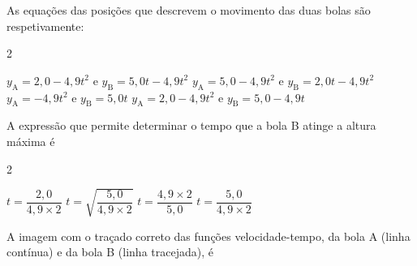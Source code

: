 \documentclass[addpoints]{exam}
\begin{document}
\begin{questions}
{		\vspace{5pt} 
		\begin{minipage}{\linewidth}
			\vspace{3pt}
			\centering
		\end{minipage}
		
		}
		
		\vspace{5pt}
		\question[10] As equações das posições que descrevem o movimento das duas bolas são respetivamente:
		
		\begin{multicols}{2}
			\begin{choices}
				\correctchoice $y_{\text{A}} = 2,0 - 4,9 t^2$ e $y_{\text{B}} = 5,0 t - 4,9 t^2$
				\choice $y_{\text{A}} = 5,0 - 4,9 t^2$ e $y_{\text{B}} = 2,0 t - 4,9 t^2$
				\choice $y_{\text{A}} = - 4,9 t^2$ e $y_{\text{B}} = 5,0 t$
				\choice $y_{\text{A}} = 2,0 - 4,9 t^2$ e $y_{\text{B}} = 5,0 - 4,9 t$
			\end{choices}
		\end{multicols}
		
		\vspace{5pt}
		\question[10] A expressão que permite determinar o tempo que a bola B atinge a altura máxima é\\
		\begin{multicols}{2}
			\begin{choices}
				\choice $t = \dfrac{2,0}{4,9 \times 2}$
				\choice $t = \sqrt{\dfrac{5,0}{4,9 \times 2}}$
				\choice $t = \dfrac{4,9 \times 2}{5,0}$
				\correctchoice $t = \dfrac{5,0}{4,9 \times 2}$
			\end{choices}
		\end{multicols}
		
		\vspace{5pt}
		\question[10] A imagem com o traçado correto das funções velocidade-tempo, da bola A (linha contínua) e da bola B (linha tracejada), é
		

\end{questions}
\end{document}
